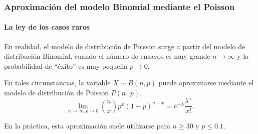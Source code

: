 \begin{frame}
\frametitle{Aproximación del modelo Binomial mediante el Poisson}
\framesubtitle{La ley de los casos raros}
En realidad, el modelo de distribución de Poisson surge a partir del modelo de distribución Binomial,  cuando el número de ensayos es muy
grande $n\rightarrow \infty$ y la probabilidad de ``éxito'' es muy pequeña $p\rightarrow 0$.

En tales circunstancias, la variable $X\sim B(n,p)$ puede aproximarse mediante el modelo de distribución de Poisson $P(n\cdot p)$.
\[
\lim_{n\rightarrow \infty, p\rightarrow 0}\binom{n}{x}p^x(1-p)^{n-x} = e^{-\lambda}\frac{\lambda^x}{x!}.
\]

En la práctica, esta aproximación suele utilizarse para $n\geq 30$ y $p\leq 0.1$.

\end{frame}




